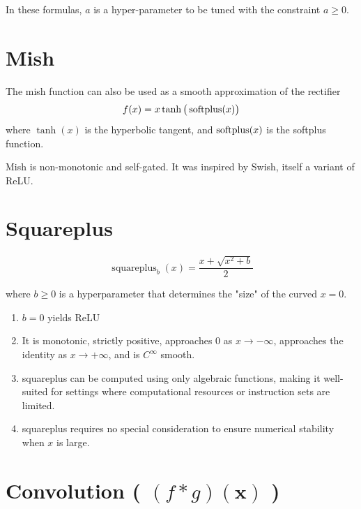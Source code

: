 In these formulas, \(\displaystyle a\) is a hyper-parameter to be tuned with the constraint \(\displaystyle a\geq 0\).

\section{Mish \cite{wiki-Rectifier}}\label{Mish}
The mish function can also be used as a smooth approximation of the rectifier
\[
    \displaystyle f(x)=x\tanh {\big (}\operatorname{softplus} (x){\big )}
\]
where \({\displaystyle \tanh(x)}\) is the hyperbolic tangent, and \({\displaystyle \operatorname{softplus}(x)}\) is the softplus function.\par
Mish is non-monotonic and self-gated. It was inspired by Swish, itself a variant of ReLU.

\section{Squareplus \cite{wiki-Rectifier}}\label{Squareplus}
\[
    {\displaystyle \operatorname {squareplus} _{b}(x)={\dfrac {x+{\sqrt {x^{2}+b}}}{2}}}
\]

where \({\displaystyle b\geq 0}\) is a hyperparameter that determines the "size" of the curved \({\displaystyle x=0}\).

\begin{enumerate}
    \item $b=0$ yields ReLU
    \item It is monotonic, strictly positive, approaches 0 as \({\displaystyle x\to -\infty }\), approaches the identity as \({\displaystyle x\to +\infty }\), and is \({\displaystyle C^{\infty }}\) smooth.
    \item squareplus can be computed using only algebraic functions, making it well-suited for settings where computational resources or instruction sets are limited.
    \item squareplus requires no special consideration to ensure numerical stability when \({\displaystyle x}\) is large.
\end{enumerate}



\section{Convolution ( $(f * g)(\mathbf{x})$ ) \cite{dnn-1}} \label{function: Convolution}

